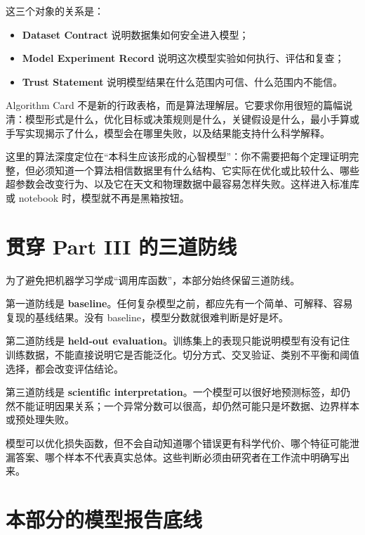这三个对象的关系是：

\begin{itemize}
    \item \textbf{Dataset Contract} 说明数据集如何安全进入模型；
    \item \textbf{Model Experiment Record} 说明这次模型实验如何执行、评估和复查；
    \item \textbf{Trust Statement} 说明模型结果在什么范围内可信、什么范围内不能信。
\end{itemize}

Algorithm Card 不是新的行政表格，而是算法理解层。它要求你用很短的篇幅说清：模型形式是什么，优化目标或决策规则是什么，关键假设是什么，最小手算或手写实现揭示了什么，模型会在哪里失败，以及结果能支持什么科学解释。

这里的算法深度定位在“本科生应该形成的心智模型”：你不需要把每个定理证明完整，但必须知道一个算法相信数据里有什么结构、它实际在优化或比较什么、哪些超参数会改变行为、以及它在天文和物理数据中最容易怎样失败。这样进入标准库或 notebook 时，模型就不再是黑箱按钮。

\section*{贯穿 Part III 的三道防线}

为了避免把机器学习学成“调用库函数”，本部分始终保留三道防线。

第一道防线是 \textbf{baseline}。任何复杂模型之前，都应先有一个简单、可解释、容易复现的基线结果。没有 baseline，模型分数就很难判断是好是坏。

第二道防线是 \textbf{held-out evaluation}。训练集上的表现只能说明模型有没有记住训练数据，不能直接说明它是否能泛化。切分方式、交叉验证、类别不平衡和阈值选择，都会改变评估结论。

第三道防线是 \textbf{scientific interpretation}。一个模型可以很好地预测标签，却仍然不能证明因果关系；一个异常分数可以很高，却仍然可能只是坏数据、边界样本或预处理失败。

\begin{warnbox}[机器学习不会替你定义科学问题]
模型可以优化损失函数，但不会自动知道哪个错误更有科学代价、哪个特征可能泄漏答案、哪个样本不代表真实总体。这些判断必须由研究者在工作流中明确写出来。
\end{warnbox}

\section*{本部分的模型报告底线}


